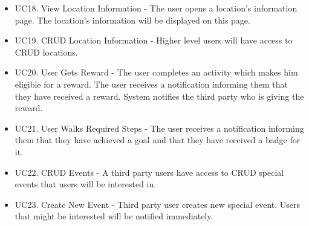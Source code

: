 \documentclass[11pt]{article}
\begin{document}
\begin{itemize}
	\item UC18. View Location Information - The user opens a location’s information page. The location’s information will be displayed on this page.
	\item UC19. CRUD Location Information - Higher level users will have access to CRUD locations.
	\item UC20. User Gets Reward - The user completes an activity which makes him eligible for a reward. The user receives a notification informing them that they have received a reward. System notifies the third party who is giving the reward.
	\item UC21. User Walks Required Steps - The user receives a notification informing them that they have achieved a goal and that they have received a badge for it.
	\item UC22. CRUD Events - A third party users have access to CRUD special events that users will be interested in.
	\item UC23. Create New Event - Third party user creates new special event. Users that might be interested will be notified immediately.
	\end{itemize}
\end{document}
